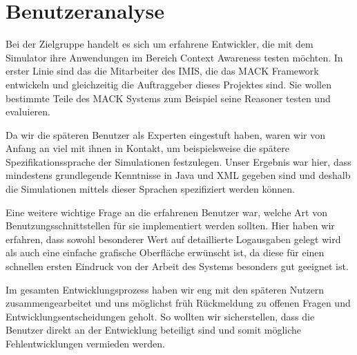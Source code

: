 
\section{Benutzeranalyse}\label{sec:user_ana}

Bei der Zielgruppe handelt es sich um erfahrene Entwickler, die mit dem Simulator ihre Anwendungen im Bereich Context Awareness testen möchten. In erster Linie sind das die Mitarbeiter des IMIS, die das MACK Framework entwickeln und gleichzeitig die Auftraggeber dieses Projektes sind. Sie wollen bestimmte Teile des MACK Systems zum Beispiel seine Reasoner testen und evaluieren.

Da wir die späteren Benutzer als Experten eingestuft haben, waren wir von Anfang an viel mit ihnen in Kontakt, um beispielsweise die spätere Spezifikationssprache der Simulationen festzulegen. Unser Ergebnis war hier, dass mindestens grundlegende Kenntnisse in Java und XML gegeben sind und deshalb die Simulationen mittels dieser Sprachen spezifiziert werden können.

Eine weitere wichtige Frage an die erfahrenen Benutzer war, welche Art von Benutzungsschnittstellen für sie implementiert werden sollten. Hier haben wir erfahren, dass sowohl besonderer Wert auf detaillierte Logausgaben gelegt wird als auch eine einfache grafische Oberfläche erwünscht ist, da diese für einen schnellen ersten Eindruck von der Arbeit des Systems besonders gut geeignet ist.

Im gesamten Entwicklungsprozess haben wir eng mit den späteren Nutzern zusammengearbeitet und uns möglichst früh Rückmeldung zu offenen Fragen und Entwicklungsentscheidungen geholt. So wollten wir sicherstellen, dass die Benutzer direkt an der Entwicklung beteiligt sind und somit mögliche Fehlentwicklungen vermieden werden.

